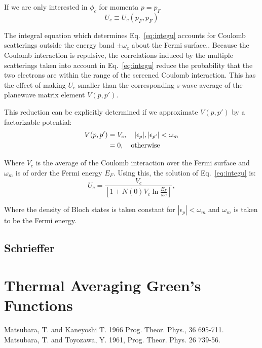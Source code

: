 If we are only interested in $\phi_{c}$ for momenta $p = p_{F}$
\begin{equation}
U_{c} \equiv U_{c}(p_{F},p_{F})
\end{equation}

The integral equation which determines Eq.~\ref{eq:integu} accounts for Coulomb
scatterings outside the energy band $\pm \omega_{c}$ about the Fermi surface..
Because the Coulomb interaction is repulsive,
the correlations induced by the multiple scatterings taken
into account in Eq.~\ref{eq:integu} reduce the probability that the two
electrons are within the range of the screened Coulomb
interaction. This has the effect of making
$U_{c}$ smaller than the corresponding s-wave average 
of the planewave matrix element $V(p,p')$.

This reduction can be explicitly determined if we approximate $V(p,p')$
by a  factorizable potential:
%
\begin{align}
V(p,p') & =  V_{c}, \quad |\epsilon_{p}|, |\epsilon_{p'}| < \omega_{m} \nonumber \\
        & =  0, \quad {\rm otherwise}
\end{align}

Where $V_{c}$ is the average of the Coulomb interaction over
the Fermi surface and $\omega_{m}$ is of order the Fermi energy
$E_{F}$. Using this, the solution of Eq.~\ref{eq:integu} is:
%
\begin{equation}
U_{c} = \frac{V_{c}}{[1+N(0)V_{c} \ln{\frac{E_{F}}{\omega{c}}}]},
\end{equation}

Where the density of Bloch states is taken constant for $|\epsilon_{p}| < \omega_{m}$ 
and $\omega_{m}$ is taken to be the Fermi energy.

%
%
\subsection{Schrieffer}

\section{Thermal Averaging Green's Functions}
Matsubara, T. and Kaneyoshi T. 1966 Prog. Theor. Phys., 36 695-711.
Matsubara, T. and Toyozawa, Y. 1961, Prog. Theor. Phys. 26 739-56.

